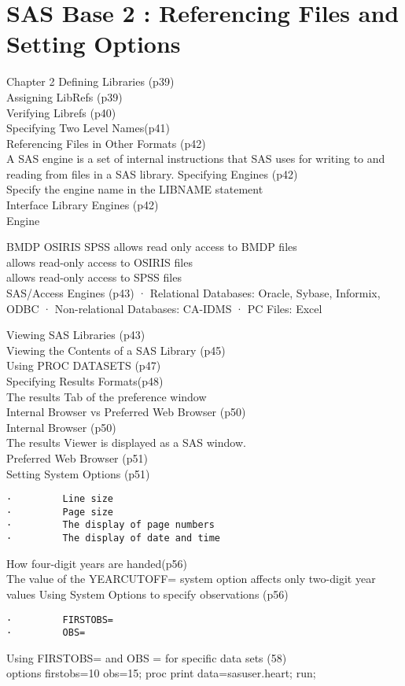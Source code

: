 \section{SAS Base 2 : Referencing Files and Setting Options}

Chapter 2
Defining Libraries (p39)\\
Assigning LibRefs (p39)\\
Verifying Librefs (p40)\\
Specifying Two Level Names(p41)\\
Referencing Files in Other Formats (p42)\\
A SAS engine is a set of internal instructions that SAS uses for writing to and reading from files in a SAS library.
Specifying Engines (p42)\\
Specify the engine name in the LIBNAME statement\\
Interface Library Engines (p42)\\
Engine

BMDP
OSIRIS
SPSS
allows read only access to BMDP files\\
allows read-only access to OSIRIS files\\
allows read-only access to SPSS files\\

SAS/Access Engines (p43)
·         Relational Databases:  Oracle, Sybase, Informix, ODBC
·         Non-relational Databases: CA-IDMS
·         PC Files: Excel

Viewing SAS Libraries (p43)\\
Viewing the Contents of a SAS Library (p45)\\
Using PROC DATASETS (p47)\\
Specifying Results Formats(p48)\\
The results Tab of the preference window\\
Internal Browser vs Preferred Web Browser (p50)\\
Internal Browser (p50)\\
The results Viewer is displayed as a SAS window.\\
Preferred Web Browser (p51)\\
Setting System Options (p51)\\
\begin{verbatim}
·         Line size
·         Page size
·         The display of page numbers
·         The display of date and time
\end{verbatim}
How four-digit years are handed(p56)\\
The value of the YEARCUTOFF= system option affects only two-digit year values
Using System Options to specify observations (p56)\\
\begin{verbatim}
·         FIRSTOBS=
·         OBS=
\end{verbatim}
Using FIRSTOBS= and OBS = for specific data sets (58)\\
options firstobs=10 obs=15;
proc print data=sasuser.heart;
run;

